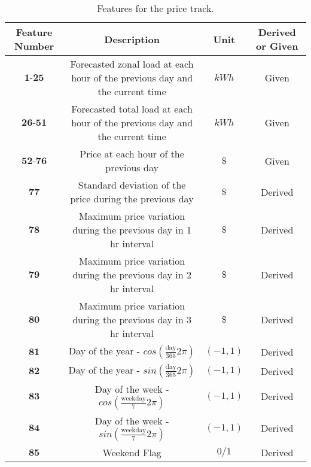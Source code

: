 \documentclass{article}
\begin{document}
\begin{table}[H]
  \centering
  \caption{Features for the price track.}
  \label{}
  \begin{adjustbox}{width=1\textwidth}
  \begin{tabular}{|c|c|c|c|}
    \hline
     Feature Number & Description & Unit & Derived or Given \\
    \hline
    $\textbf{1-25}$ & Forecasted zonal load at each hour of the previous day and the current time & $kWh$ & Given \\
    \hline
    $\textbf{26-51}$ & Forecasted total load at each hour of the previous day and the current time & $kWh$ & Given \\
    \hline
    $\textbf{52-76}$ & Price at each hour of the previous day & $\$$ & Given \\
    \hline
    $\textbf{77}$ & Standard deviation of the price during the previous day & $\$$ & Derived \\
    \hline
    $\textbf{78}$ & Maximum price variation during the previous day in 1 hr interval & $\$$ & Derived \\
    \hline
    $\textbf{79}$ & Maximum price variation during the previous day in 2 hr interval & $\$$ & Derived \\
    \hline
    $\textbf{80}$ & Maximum price variation during the previous day in 3 hr interval & $\$$ & Derived \\
    \hline
    $\textbf{81}$ & Day of the year - $cos(\frac{\text{day}}{365}2\pi)$ & $(-1,1)$ & Derived \\
    \hline
    $\textbf{82}$ & Day of the year - $sin(\frac{\text{day}}{365}2\pi)$ & $(-1,1)$ & Derived \\
    \hline
    $\textbf{83}$ & Day of the week - $cos(\frac{\text{weekday}}{7}2\pi)$ & $(-1,1)$ & Derived \\
    \hline
    $\textbf{84}$ & Day of the week - $sin(\frac{\text{weekday}}{7}2\pi)$ & $(-1,1)$ & Derived \\
    \hline
    $\textbf{85}$ & Weekend Flag & $0/1$ & Derived \\
    \hline
  \end{tabular}
  \end{adjustbox}
\end{table}
\end{document}
